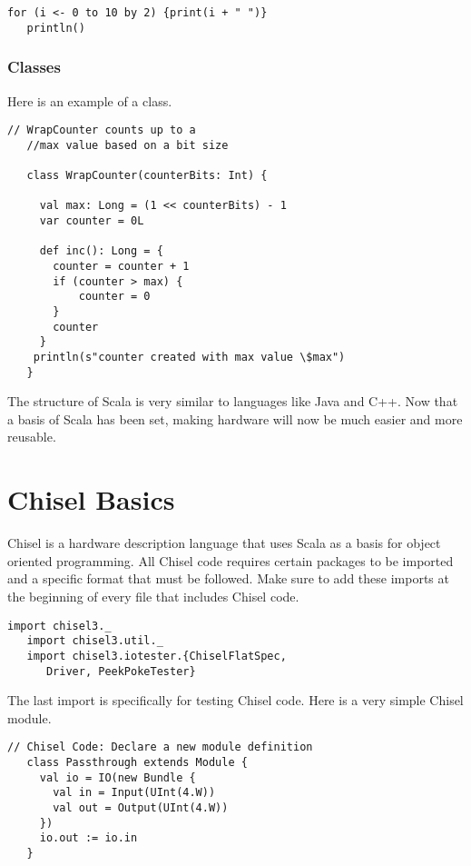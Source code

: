 \documentclass[12pt, letterpaper]{report}
\begin{document}
\begin{lstlisting}[style=scala]
   for (i <- 0 to 10 by 2) {print(i + " ")}
   println()
\end{lstlisting}

\subsection{Classes}
Here is an example of a class.

\begin{lstlisting}[style=scala]
   // WrapCounter counts up to a 
   //max value based on a bit size

   class WrapCounter(counterBits: Int) {

     val max: Long = (1 << counterBits) - 1
     var counter = 0L
    
     def inc(): Long = {
       counter = counter + 1
       if (counter > max) {
           counter = 0
       }
       counter
     }
    println(s"counter created with max value \$max")
   }
\end{lstlisting}

The structure of Scala is very similar to languages like Java and C++. Now that a basis of Scala has been 
set, making hardware will now be much easier and more reusable.

\chapter{Chisel Basics}
Chisel is a hardware description language that uses Scala as a basis for object oriented programming. All Chisel code requires
certain packages to be imported and a specific format that must be followed.
Make sure to add these imports at the beginning of every file that includes Chisel code.

\begin{lstlisting}[style=scala]
   import chisel3._
   import chisel3.util._
   import chisel3.iotester.{ChiselFlatSpec, 
      Driver, PeekPokeTester}
\end{lstlisting}
The last import is specifically for testing Chisel code. Here is a very simple Chisel module.

\begin{lstlisting}[style=scala]
   // Chisel Code: Declare a new module definition
   class Passthrough extends Module {
     val io = IO(new Bundle {
       val in = Input(UInt(4.W))
       val out = Output(UInt(4.W))
     })
     io.out := io.in
   }
\end{lstlisting}
\end{document}
